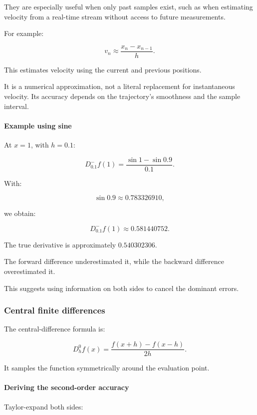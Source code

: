 They are especially useful when only past samples exist, such as when estimating velocity from a real-time stream without access to future measurements.

For example:

\[
v_n\approx\frac{x_n-x_{n-1}}h.
\]

This estimates velocity using the current and previous positions.

It is a numerical approximation, not a literal replacement for instantaneous velocity. Its accuracy depends on the trajectory's smoothness and the sample interval.

\paragraph{Example using sine}\label{02-foundations-ii-ch025-example-using-sine}

At \(x=1\), with \(h=0.1\):

\[
D_{0.1}^-f(1) = \frac{\sin1-\sin0.9}{0.1}.
\]

With:

\[
\sin0.9\approx0.783326910,
\]

we obtain:

\[
\boxed{ D_{0.1}^-f(1)\approx0.581440752 }.
\]

The true derivative is approximately \(0.540302306\).

The forward difference underestimated it, while the backward difference overestimated it.

This suggests using information on both sides to cancel the dominant errors.

\subsubsection{Central finite differences}\label{02-foundations-ii-ch025-central-finite-differences}

The central-difference formula is:

\[
\boxed{ D_h^0f(x)= \frac{f(x+h)-f(x-h)}{2h} }.
\]

It samples the function symmetrically around the evaluation point.

\paragraph{Deriving the second-order accuracy}\label{02-foundations-ii-ch025-deriving-the-second-order-accuracy}

Taylor-expand both sides:

